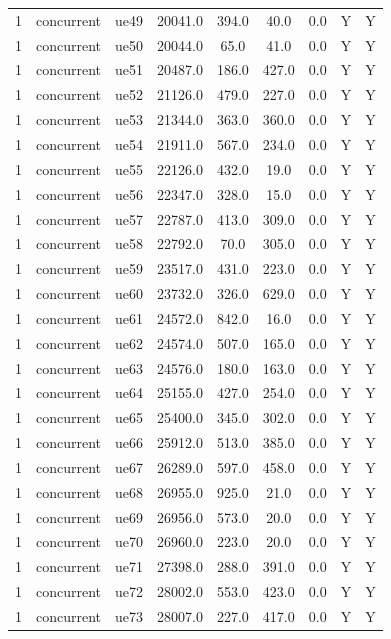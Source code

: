 \begin{table}[ht]
\begin{tabular}{|c|c|c|c|c|c|c|c|c|}
1 & concurrent & ue49 & 20041.0 & 394.0 & 40.0 & 0.0 & Y & Y \\
1 & concurrent & ue50 & 20044.0 & 65.0 & 41.0 & 0.0 & Y & Y \\
1 & concurrent & ue51 & 20487.0 & 186.0 & 427.0 & 0.0 & Y & Y \\
1 & concurrent & ue52 & 21126.0 & 479.0 & 227.0 & 0.0 & Y & Y \\
1 & concurrent & ue53 & 21344.0 & 363.0 & 360.0 & 0.0 & Y & Y \\
1 & concurrent & ue54 & 21911.0 & 567.0 & 234.0 & 0.0 & Y & Y \\
1 & concurrent & ue55 & 22126.0 & 432.0 & 19.0 & 0.0 & Y & Y \\
1 & concurrent & ue56 & 22347.0 & 328.0 & 15.0 & 0.0 & Y & Y \\
1 & concurrent & ue57 & 22787.0 & 413.0 & 309.0 & 0.0 & Y & Y \\
1 & concurrent & ue58 & 22792.0 & 70.0 & 305.0 & 0.0 & Y & Y \\
1 & concurrent & ue59 & 23517.0 & 431.0 & 223.0 & 0.0 & Y & Y \\
1 & concurrent & ue60 & 23732.0 & 326.0 & 629.0 & 0.0 & Y & Y \\
1 & concurrent & ue61 & 24572.0 & 842.0 & 16.0 & 0.0 & Y & Y \\
1 & concurrent & ue62 & 24574.0 & 507.0 & 165.0 & 0.0 & Y & Y \\
1 & concurrent & ue63 & 24576.0 & 180.0 & 163.0 & 0.0 & Y & Y \\
1 & concurrent & ue64 & 25155.0 & 427.0 & 254.0 & 0.0 & Y & Y \\
1 & concurrent & ue65 & 25400.0 & 345.0 & 302.0 & 0.0 & Y & Y \\
1 & concurrent & ue66 & 25912.0 & 513.0 & 385.0 & 0.0 & Y & Y \\
1 & concurrent & ue67 & 26289.0 & 597.0 & 458.0 & 0.0 & Y & Y \\
1 & concurrent & ue68 & 26955.0 & 925.0 & 21.0 & 0.0 & Y & Y \\
1 & concurrent & ue69 & 26956.0 & 573.0 & 20.0 & 0.0 & Y & Y \\
1 & concurrent & ue70 & 26960.0 & 223.0 & 20.0 & 0.0 & Y & Y \\
1 & concurrent & ue71 & 27398.0 & 288.0 & 391.0 & 0.0 & Y & Y \\
1 & concurrent & ue72 & 28002.0 & 553.0 & 423.0 & 0.0 & Y & Y \\
1 & concurrent & ue73 & 28007.0 & 227.0 & 417.0 & 0.0 & Y & Y \\

\end{tabular}
\end{table}
